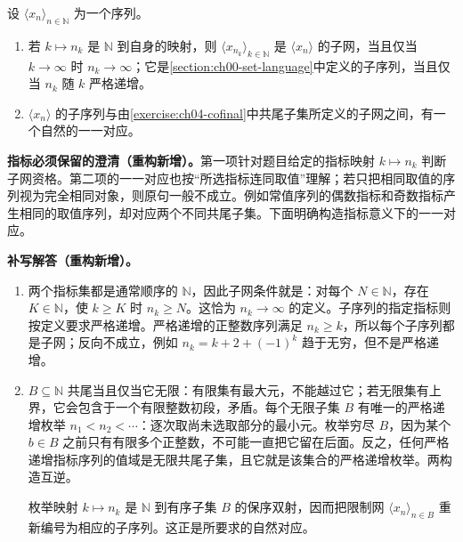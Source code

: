 \documentclass[../../main.tex]{subfiles}%
\begin{document}
\begin{exercise}\label{exercise:ch04-subsequence-subnet}
设 $\langle x_n\rangle_{n\in\mathbb N}$ 为一个序列。
\begin{enumerate}
\item\label{item:ch04-sequential-subnet-condition} 若 $k\mapsto n_k$ 是 $\mathbb N$ 到自身的映射，则 $\langle x_{n_k}\rangle_{k\in\mathbb N}$ 是 $\langle x_n\rangle$ 的子网，当且仅当 $k\to\infty$ 时 $n_k\to\infty$；它是\cref{section:ch00-set-language}中定义的子序列，当且仅当 $n_k$ 随 $k$ 严格递增。
\item\label{item:ch04-subsequence-cofinal-bijection} $\langle x_n\rangle$ 的子序列与由\cref{exercise:ch04-cofinal}中共尾子集所定义的子网之间，有一个自然的一一对应。
\end{enumerate}
\end{exercise}
\begin{remark}
\textbf{指标必须保留的澄清（重构新增）。}第一项针对题目给定的指标映射 $k\mapsto n_k$ 判断子网资格。第二项的一一对应也按“所选指标连同取值”理解；若只把相同取值的序列视为完全相同对象，则原句一般不成立。例如常值序列的偶数指标和奇数指标产生相同的取值序列，却对应两个不同共尾子集。下面明确构造指标意义下的一一对应。
\end{remark}
\begin{solution}
\textbf{补写解答（重构新增）。}
\begin{enumerate}
\item 两个指标集都是通常顺序的 $\mathbb N$，因此子网条件就是：对每个 $N\in\mathbb N$，存在 $K\in\mathbb N$，使 $k\ge K$ 时 $n_k\ge N$。这恰为 $n_k\to\infty$ 的定义。子序列的指定指标则按定义要求严格递增。严格递增的正整数序列满足 $n_k\ge k$，所以每个子序列都是子网；反向不成立，例如 $n_k=k+2+(-1)^k$ 趋于无穷，但不是严格递增。
\item $B\subseteq\mathbb N$ 共尾当且仅当它无限：有限集有最大元，不能越过它；若无限集有上界，它会包含于一个有限整数初段，矛盾。每个无限子集 $B$ 有唯一的严格递增枚举 $n_1<n_2<\cdots$：逐次取尚未选取部分的最小元。枚举穷尽 $B$，因为某个 $b\in B$ 之前只有有限多个正整数，不可能一直把它留在后面。反之，任何严格递增指标序列的值域是无限共尾子集，且它就是该集合的严格递增枚举。两构造互逆。

枚举映射 $k\mapsto n_k$ 是 $\mathbb N$ 到有序子集 $B$ 的保序双射，因而把限制网 $\langle x_n\rangle_{n\in B}$ 重新编号为相应的子序列。这正是所要求的自然对应。
\end{enumerate}
\end{solution}
\end{document}
